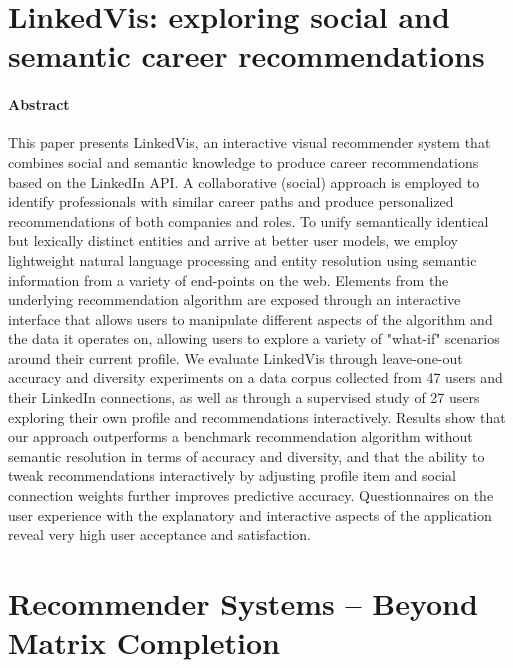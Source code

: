 \documentclass[oneside]{book}
\begin{document}
\section{LinkedVis: exploring social and semantic career recommendations}
\paragraph{Abstract}
This paper presents LinkedVis, an interactive visual recommender system that combines social and semantic knowledge to produce career recommendations based on the LinkedIn API. A collaborative (social) approach is employed to identify professionals with similar career paths and produce personalized recommendations of both companies and roles. To unify semantically identical but lexically distinct entities and arrive at better user models, we employ lightweight natural language processing and entity resolution using semantic information from a variety of end-points on the web. Elements from the underlying recommendation algorithm are exposed through an interactive interface that allows users to manipulate different aspects of the algorithm and the data it operates on, allowing users to explore a variety of "what-if" scenarios around their current profile. We evaluate LinkedVis through leave-one-out accuracy and diversity experiments on a data corpus collected from 47 users and their LinkedIn connections, as well as through a supervised study of 27 users exploring their own profile and recommendations interactively. Results show that our approach outperforms a benchmark recommendation algorithm without semantic resolution in terms of accuracy and diversity, and that the ability to tweak recommendations interactively by adjusting profile item and social connection weights further improves predictive accuracy. Questionnaires on the user experience with the explanatory and interactive aspects of the application reveal very high user acceptance and satisfaction.

\section{Recommender Systems – Beyond Matrix Completion}
\end{document}
